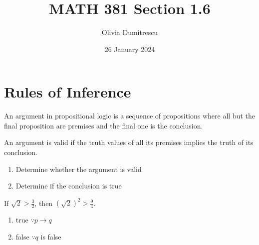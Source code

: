 \documentclass[a4paper, 12pt]{article}
\title{MATH 381 Section 1.6}
\author{Olivia Dumitrescu}
\date{26 January 2024}
\newenvironment{definition}[1][Definition]{\begin{trivlist}
\item[\hskip \labelsep {\bfseries #1}]}{\end{trivlist}}
\newenvironment{example}[1][Example]{\begin{trivlist}
\item[\hskip \labelsep {\bfseries #1}]}{\end{trivlist}}
\newenvironment{remark}[1][Remark]{\begin{trivlist}
\item[\hskip \labelsep {\bfseries #1}]}{\end{trivlist}}
\newcommand{\then}{\rightarrow}
\begin{document}
    \maketitle
    \section*{Rules of Inference}
    \begin{definition}
        An argument in propositional logic is a sequence of propositions where all but
        the final proposition are premises and the final one is the conclusion.
    \end{definition}
    \begin{remark}
        An argument is valid if the truth values of all its premises implies the truth
        of its conclusion.
    \end{remark}
    \begin{example}
        \hfill
        \begin{enumerate}
            \item Determine whether the argument is valid
            \item Determine if the conclusion is true
        \end{enumerate}
        If $\sqrt{2} > \frac{3}{2}$, then $(\sqrt{2})^2 > \frac{9}{4}$.
        \begin{enumerate}
            \item true $\because p \then q$
            \item false $\because q$ is false
        \end{enumerate}
    \end{example}
\end{document}
